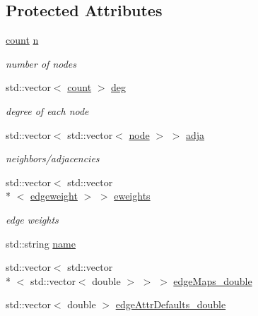 \subsection*{Protected Attributes}
\begin{DoxyCompactItemize}
\item 
\hyperlink{namespace_networ_kit_ad4c536a5339a8bf2f91f418b9a67a7d8}{count} \hyperlink{class_networ_kit_1_1_graph_aae05e611d6d5eb42e045d374d73eb34a}{n}
\begin{DoxyCompactList}\small\item\em number of nodes \end{DoxyCompactList}\item 
std\-::vector$<$ \hyperlink{namespace_networ_kit_ad4c536a5339a8bf2f91f418b9a67a7d8}{count} $>$ \hyperlink{class_networ_kit_1_1_graph_a264a36a2017c51a1c3f71e7429e47b22}{deg}
\begin{DoxyCompactList}\small\item\em degree of each node \end{DoxyCompactList}\item 
std\-::vector$<$ std\-::vector$<$ \hyperlink{namespace_networ_kit_a61914158fd771265be48de9942369160}{node} $>$ $>$ \hyperlink{class_networ_kit_1_1_graph_ad731885a6d7d7cf22ec8a8babc77d389}{adja}
\begin{DoxyCompactList}\small\item\em neighbors/adjacencies \end{DoxyCompactList}\item 
std\-::vector$<$ std\-::vector\\*
$<$ \hyperlink{namespace_networ_kit_a831b108dbcd79dad062d9e28b1b4e3dd}{edgeweight} $>$ $>$ \hyperlink{class_networ_kit_1_1_graph_a6fb34025f32ff2850911ee0e90b085fa}{eweights}
\begin{DoxyCompactList}\small\item\em edge weights \end{DoxyCompactList}\item 
std\-::string \hyperlink{class_networ_kit_1_1_graph_aad1c9901bb8b7493df628469be54300a}{name}
\item 
std\-::vector$<$ std\-::vector\\*
$<$ std\-::vector$<$ double $>$ $>$ $>$ \hyperlink{class_networ_kit_1_1_graph_a63a00d1d3330ce8050fcd77794ec8d45}{edge\-Maps\-\_\-double}
\item 
std\-::vector$<$ double $>$ \hyperlink{class_networ_kit_1_1_graph_ac3f25277b53638e1486cde303803eb0a}{edge\-Attr\-Defaults\-\_\-double}
\end{DoxyCompactItemize}
